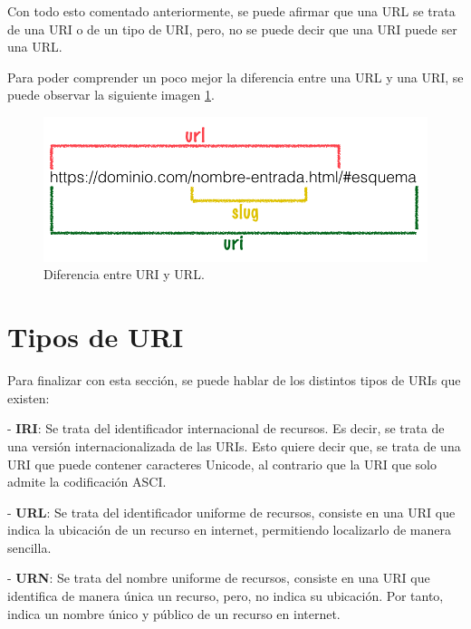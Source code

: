 \documentclass[11pt]{report}
\begin{document}
Con todo esto comentado anteriormente, se puede afirmar que una URL se trata de una URI o de un tipo de URI, pero, no se puede decir que una URI puede ser una URL.

Para poder comprender un poco mejor la diferencia entre una URL y una URI, se puede observar la siguiente imagen \ref{fig:URI-URL}.

\begin{figure}[H]
	\centering
	\includegraphics[scale=0.6]{../img/diferencia-entre-url-y-uri.png}
	\caption{Diferencia entre URI y URL.}
	\label{fig:URI-URL}
\end{figure}


\section{Tipos de URI}

Para finalizar con esta sección, se puede hablar de los distintos tipos de URIs que existen:

- \textbf{IRI}: Se trata del identificador internacional de recursos. Es decir, se trata de una versión internacionalizada de las URIs. Esto quiere decir que, se trata de una URI que puede contener caracteres Unicode, al contrario que la URI que solo admite la codificación ASCI.

- \textbf{URL}: Se trata del identificador uniforme de recursos, consiste en una URI que indica la ubicación de un recurso en internet, permitiendo localizarlo de manera sencilla.

- \textbf{URN}: Se trata del nombre uniforme de recursos, consiste en una URI que identifica de manera única un recurso, pero, no indica su ubicación. Por tanto, indica un nombre único y público de un recurso en internet.
\end{document}
